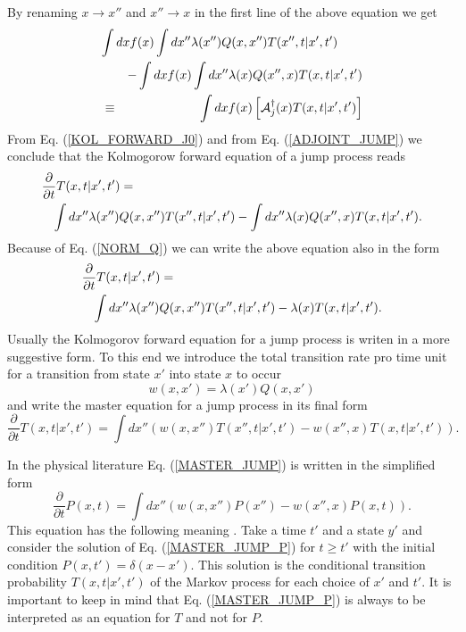 By renaming $x \rightarrow x''$ and $x'' \rightarrow x$  in the first line of the
above equation we get
\begin{eqnarray}
\label{ADJOINT_JUMP}
\lefteqn{\int dx  f(x) \int dx'' \lambda(x'')  Q(x,x'') T(x'',t|x',t')}
     \nonumber \\
& & - \int dx f(x) \int dx'' \lambda(x)  Q(x'',x) T(x,t|x',t') \nonumber \\
& \equiv & \int dx f(x) \left[ {\cal{A}}_j^{\dagger}(x) 
          T(x,t|x',t')      \right]
\end{eqnarray}
From Eq. (\ref{KOL_FORWARD_J0}) and from Eq. (\ref{ADJOINT_JUMP}) 
we conclude that the Kolmogorow forward equation of a jump process
reads
\begin{eqnarray} 
\label{KOL_FORWARD_J1}
\lefteqn{\frac{\partial}{\partial t} T(x,t|x',t') =} \nonumber \\ 
&& \int dx'' \lambda(x'') Q(x,x'') T(x'',t|x',t')
 - \int dx'' \lambda(x) Q(x'',x) T(x,t|x',t').
\end{eqnarray}
Because of Eq. (\ref{NORM_Q}) we can write the above equation also 
in the form
\begin{eqnarray} 
\label{KOL_FORWARD_J2}
\lefteqn{\frac{\partial}{\partial t} T(x,t|x',t') =} \nonumber \\ 
&& \int dx'' \lambda(x'') Q(x,x'') T(x'',t|x',t')
 - \lambda(x) T(x,t|x',t').
\end{eqnarray}
Usually the Kolmogorov forward equation for a jump process is 
writen in a more suggestive form. To this end we introduce the 
total transition rate pro time unit for a transition from state $x'$ 
into  state $x$ to occur
\begin{equation*}
w(x,x') = \lambda(x') Q(x,x')
\end{equation*}
and write the master equation for a jump process in its final form
\begin{equation}
\label{MASTER_JUMP}
\frac{\partial}{\partial t} T(x,t|x',t') =
 \int dx'' \left( w(x,x'') T(x'',t|x',t')
 - w(x'',x) T(x,t|x',t') \right).
\end{equation}

In the physical literature Eq. (\ref{MASTER_JUMP}) is written in 
the simplified form
\begin{equation}
\label{MASTER_JUMP_P}
\frac{\partial}{\partial t} P(x,t) =
 \int dx'' \left( w(x,x'') P(x'')
 - w(x'',x) P(x,t) \right).
\end{equation}
This equation has the following meaning \cite{VAN_KAMPEN}. Take a 
time $t'$ and a state $y'$ and consider the solution of Eq. (\ref{MASTER_JUMP_P})
for $t \ge t'$ with the initial condition $P(x,t') = 
\delta(x-x')$. This solution is the conditional transition 
probability $T(x,t|x',t')$ of the Markov process for each choice
of $x'$ and $t'$. It is important to keep in mind that Eq. (\ref{MASTER_JUMP_P})
is always to be interpreted as an equation for $T$ and not for 
$P$.

